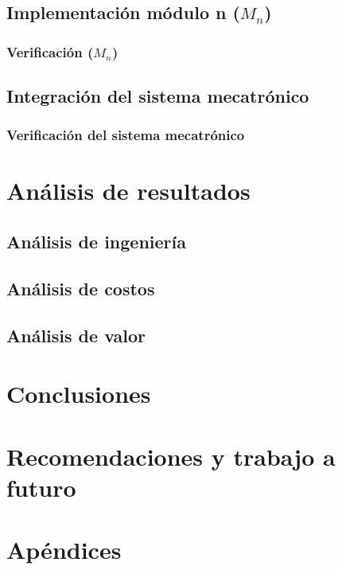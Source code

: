 \documentclass[12pt]{article}
\begin{document}
\subsection{Implementación módulo n ($M_n$)}
\subsubsection{Verificación ($M_n$)}

\subsection{Integración del sistema mecatrónico}
\subsubsection{Verificación del sistema mecatrónico}


\section{Análisis de resultados}
\subsection{Análisis de ingeniería}
\subsection{Análisis de costos}
\subsection{Análisis de valor}


\newpage
{}
\section*{Conclusiones}


\section*{Recomendaciones y trabajo a futuro}



\newpage
{}
\section*{Apéndices}
\end{document}
